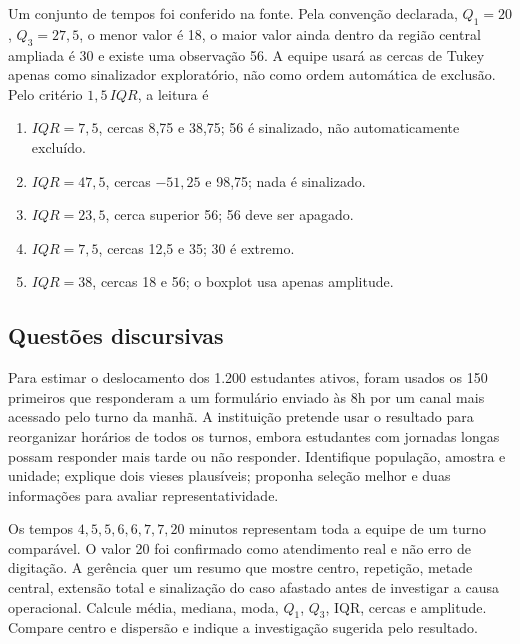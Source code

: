 \TextoBase Um conjunto de tempos foi conferido na fonte. Pela convenção declarada, $Q_1=20$, $Q_3=27{,}5$, o menor valor é 18, o maior valor ainda dentro da região central ampliada é 30 e existe uma observação 56. A equipe usará as cercas de Tukey apenas como sinalizador exploratório, não como ordem automática de exclusão.
\FonteDidatica
\Comando Pelo critério $1{,}5\,IQR$, a leitura é
\begin{enumerate}[label=\Alph*)]\item $IQR=7{,}5$, cercas 8,75 e 38,75; 56 é sinalizado, não automaticamente excluído.\item $IQR=47{,}5$, cercas $-51{,}25$ e 98,75; nada é sinalizado.\item $IQR=23{,}5$, cerca superior 56; 56 deve ser apagado.\item $IQR=7{,}5$, cercas 12,5 e 35; 30 é extremo.\item $IQR=38$, cercas 18 e 56; o boxplot usa apenas amplitude.\end{enumerate}

\subsection{Questões discursivas}
\TextoBase Para estimar o deslocamento dos 1.200 estudantes ativos, foram usados os 150 primeiros que responderam a um formulário enviado às 8h por um canal mais acessado pelo turno da manhã. A instituição pretende usar o resultado para reorganizar horários de todos os turnos, embora estudantes com jornadas longas possam responder mais tarde ou não responder.
\FonteDidatica
\Comando Identifique população, amostra e unidade; explique dois vieses plausíveis; proponha seleção melhor e duas informações para avaliar representatividade.

\TextoBase Os tempos $4,5,5,6,6,7,7,20$ minutos representam toda a equipe de um turno comparável. O valor 20 foi confirmado como atendimento real e não erro de digitação. A gerência quer um resumo que mostre centro, repetição, metade central, extensão total e sinalização do caso afastado antes de investigar a causa operacional.
\FonteDidatica
\Comando Calcule média, mediana, moda, $Q_1$, $Q_3$, IQR, cercas e amplitude. Compare centro e dispersão e indique a investigação sugerida pelo resultado.

